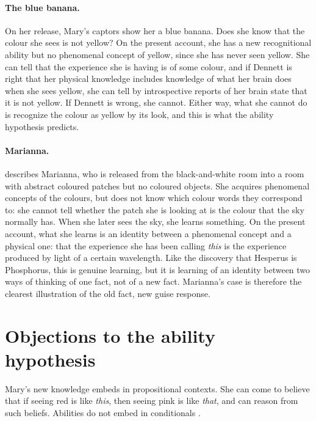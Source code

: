 \documentclass{situationist-preprint}
\begin{document}
\paragraph{The blue banana.} On her release, Mary's captors show her a blue banana. Does she know that the colour she sees is not yellow? On the present account, she has a new recognitional ability but no phenomenal concept of yellow, since she has never seen yellow. She can tell that the experience she is having is of some colour, and if Dennett is right that her physical knowledge includes knowledge of what her brain does when she sees yellow, she can tell by introspective reports of her brain state that it is not yellow. If Dennett is wrong, she cannot. Either way, what she cannot do is recognize the colour as yellow by its look, and this is what the ability hypothesis predicts.

\paragraph{Marianna.} \citet{NidaRumelin1996} describes Marianna, who is released from the black-and-white room into a room with abstract coloured patches but no coloured objects. She acquires phenomenal concepts of the colours, but does not know which colour words they correspond to: she cannot tell whether the patch she is looking at is the colour that the sky normally has. When she later sees the sky, she learns something. On the present account, what she learns is an identity between a phenomenal concept and a physical one: that the experience she has been calling \emph{this} is the experience produced by light of a certain wavelength. Like the discovery that Hesperus is Phosphorus, this is genuine learning, but it is learning of an identity between two ways of thinking of one fact, not of a new fact. Marianna's case is therefore the clearest illustration of the old fact, new guise response.

\section{Objections to the ability hypothesis}

\begin{objection}
Mary's new knowledge embeds in propositional contexts. She can come to believe that if seeing red is like \emph{this}, then seeing pink is like \emph{that}, and can reason from such beliefs. Abilities do not embed in conditionals \citep{Loar1990}.
\end{objection}
\end{document}
